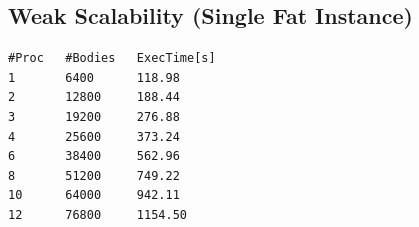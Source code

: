 \documentclass{article}
\begin{document}
\subsection{Weak Scalability (Single Fat Instance)}
\begin{verbatim}
#Proc   #Bodies   ExecTime[s]
1       6400      118.98
2       12800     188.44
3       19200     276.88
4       25600     373.24
6       38400     562.96
8       51200     749.22
10      64000     942.11
12      76800     1154.50
\end{verbatim}






 
\end{document}
